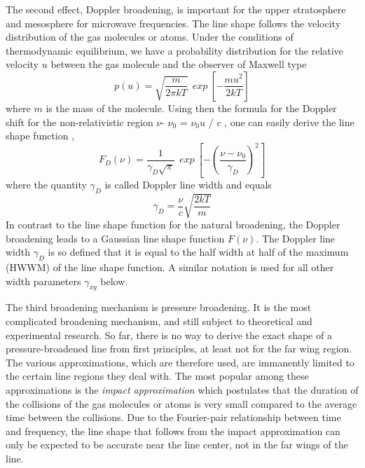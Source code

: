 The second effect, Doppler broadening, is important for the upper
stratosphere and mesosphere for microwave frequencies. The line shape
follows the velocity distribution of the gas molecules or atoms. Under the
conditions of thermodynamic equilibrium, we have  a probability distribution for
the relative velocity $u$ between the gas molecule and the observer of Maxwell
type 
\begin{equation}\label{eq:abs_theory:maxwell_distribution1}
  p(u)=\sqrt{\frac{m}{2\pi kT}}~~exp~\left[-\frac{mu^2}{2kT}\right]
\end{equation}
where $m$ is the mass of the molecule. Using then the formula for the
Doppler shift for the non-relativistic region    $\nu$- $\nu_0$ =
$\nu_0$$u$ / $c$ , one can easily derive the line shape function \citep{bernath:95}, 
\begin{equation}
 F_D(\nu)=\frac{1}{\gamma_D\sqrt{\pi}}~~exp~\left[-\left(\frac{\nu - \nu_0}{\gamma_D}\right)^2\right]
\end{equation}
where the quantity $\gamma_D$ is called Doppler line width and equals
\begin{equation}
 \gamma_D=\frac{\nu}{c}\sqrt{\frac{2kT}{m}}
\end{equation}
In contrast to the line shape function for the natural
broadening, the Doppler broadening leads to a Gaussian
line shape function $F(\nu)$. The Doppler line width $\gamma_D$ is so
defined that it is equal to the half width at half of the maximum
(HWWM) of the line shape function. A similar notation is used
for all other width parameters $\gamma_{xy}$ below.

The third broadening mechanism is pressure broadening.  It is the most
complicated broadening mechanism, and still subject to theoretical and
experimental research. So far, there is no way to derive the exact
shape of a pressure-broadened line from first principles, at least not
for the far wing region. The various approximations, which are
therefore used, are immanently limited to the certain line regions
they deal with.  The most popular among these approximations is the
{\it{impact approximation}} which postulates that the duration of the
collisions of the gas molecules or atoms is very small compared to the average
time between the collisions.  Due to the Fourier-pair relationship
between time and frequency, the line shape that follows from the
impact approximation can only be expected to be accurate near the line
center, not in the far wings of the line.

